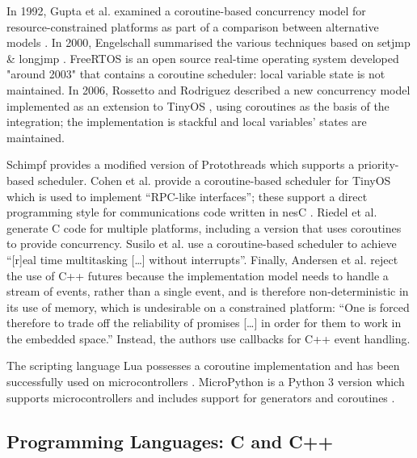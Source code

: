 In 1992, Gupta et al. examined a coroutine-based concurrency model for resource-constrained platforms as part of a comparison between alternative models \cite{Gupta1992}. In 2000, Engelschall summarised the various techniques based on setjmp \& longjmp \cite{Engelschall2000}. FreeRTOS \cite{Barry2018} is an open source real-time operating system developed "around 2003" that contains a coroutine scheduler: local variable state is not maintained. In 2006, Rossetto and Rodriguez described a new concurrency model \cite{Rossetto2006} implemented as an extension to TinyOS \cite{Levis2005}, using coroutines as the basis of the integration; the implementation is stackful and local variables’ states are maintained. 


Schimpf \cite{Schimpf2012b} provides a modified version of Protothreads which supports a priority-based scheduler. Cohen et al. \cite{Cohen2007b} provide a coroutine-based scheduler for TinyOS \cite{Levis2005} which is used to implement “RPC-like interfaces”; these support a direct programming style for communications code written in nesC \cite{Gay2003}. Riedel et al.\cite{Riedel2010} generate C code for multiple platforms, including a version that uses coroutines to provide concurrency. Susilo et al. \cite{Susilo2009} use a coroutine-based scheduler to achieve “[r]eal time multitasking […] without interrupts”. Finally, Andersen et al. \cite{Andersen2017b} reject the use of C++ futures because the implementation model needs to handle a stream of events, rather than a single event, and is therefore non-deterministic in its use of memory, which is undesirable on a constrained platform: “One is forced therefore to trade off the reliability of promises […] in order for them to work in the embedded space.” Instead, the authors use callbacks for C++ event handling.

The scripting language Lua possesses a coroutine implementation \cite{Moura2004a} and has been successfully used on microcontrollers \cite{Hempel2008}. MicroPython \cite{George2014a} is a Python 3 version which supports microcontrollers \cite{George2014b} and includes support for generators and coroutines \cite{VanRossum2005, Python2017}.

\subsection{Programming Languages: C and C++}

